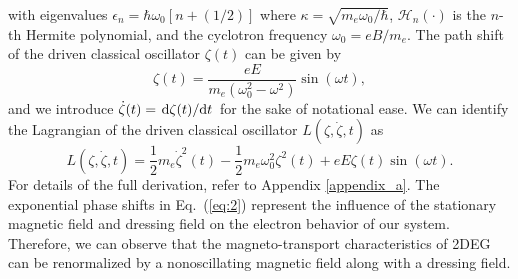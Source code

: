 with eigenvalues $\epsilon_n = \hbar \omega_0 [n + (1/2)]$ where $\kappa = \sqrt{{m_e \omega_0}/{\hbar}}$, $\mathcal{H}_n(\cdot)$ is the $n$-th Hermite polynomial, and the cyclotron frequency $\omega_0 = eB/m_e$.
The path shift of the driven classical oscillator $\zeta(t)$ can be given by
\begin{equation} \label{eq:4}
  \zeta(t) = \frac{eE}{m_e(\omega_0^2 - \omega^2)}\sin(\omega t),
\end{equation}
and we introduce $\dot{\zeta}(t) = \dv*{\zeta(t)}{t}$ for the sake of notational ease. We can identify the Lagrangian of the driven classical oscillator $L(\zeta,\dot{\zeta},t)$ as
\begin{equation} \label{eq:5}
  L(\zeta,\dot{\zeta},t) = \frac{1}{2} m_e\dot{\zeta}^2(t) - \frac{1}{2}m_e\omega_0^2 \zeta^2(t) + eE\zeta(t) \sin(\omega t).
\end{equation}
For details of the full derivation, refer to Appendix \ref{appendix_a}.
The exponential phase shifts in Eq.~(\ref{eq:2}) represent the influence of the stationary magnetic field and dressing field on the electron behavior of our system. Therefore, we can observe that the magneto-transport characteristics of 2DEG can be renormalized by a nonoscillating magnetic field along with a dressing field.
